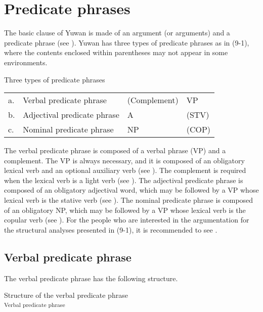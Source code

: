 \chapter{Predicate phrases}\label{chap:9}

The basic clause of Yuwan is made of an argument (or arguments) and a predicate phrase (see ). Yuwan has three types of predicate phrases as in (9-1), where the contents enclosed within parentheses may not appear in some environments.

\ea   Three types of predicate phrases \label{ex:9.1}
  \begin{tabular}{@{}l@{ }lll@{}}
  a. & Verbal predicate phrase      &  (Complement)         &  VP\footnotemark[1]\\
  b. & Adjectival predicate phrase  &  A\footnotemark[2]    & (STV\footnotemark[3])\\
  c. & Nominal predicate phrase     &  NP                   & (COP\footnotemark[4])\\
  \end{tabular}
\z
{}

The verbal predicate phrase is composed of a verbal phrase (VP) and a complement. The VP is always necessary, and it is composed of an obligatory lexical verb and an optional auxiliary verb (see ). The complement is required when the lexical verb is a light verb (see ). The adjectival predicate phrase is composed of an obligatory adjectival word, which may be followed by a VP whose lexical verb is the stative verb (see ). The nominal predicate phrase is composed of an obligatory NP, which may be followed by a VP whose lexical verb is the copular verb (see ). For the people who are interested in the argumentation for the structural analyses presented in (9-1), it is recommended to see .

\section{Verbal predicate phrase}\label{sec:9.1}

The verbal predicate phrase has the following structure.

\ea   Structure of the verbal predicate phrase \label{ex:9.2}\\\textsubscript{Verbal predicate phrase}
\z

